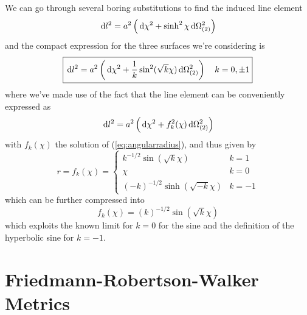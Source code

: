 We can go through several boring substitutions to find the induced line element
\begin{equation}
    \,\text{d}l^{2} = a^{2}\left(\,\text{d}\chi^{2} + \sinh^{2}\chi\,\text{d}\Omega_{(2)}^{2}\right)
\end{equation}
and the compact expression for the three surfaces we're considering is
\begin{equation}
    \boxed{
        \,\text{d}l^{2} = a^{2}\left(\,\text{d}\chi^{2} + \frac{1}{k}\sin^{2}(\sqrt{k}\chi)\,\text{d}\Omega_{(2)}^{2}\right) \quad k=0,\pm 1
    }
\end{equation}
where we've made use of the fact that the line element can be conveniently expressed as
\begin{equation}
    \,\text{d}l^{2} = a^{2}\left(\,\text{d}\chi^{2} + f_{k}^{2}(\chi)\,\text{d}\Omega_{(2)}^{2}\right)
\end{equation}
with $f_{k}(\chi)$ the solution of (\ref{eq:angularradius}), and thus given by
\begin{equation}
    r = f_{k}(\chi) = \left\{
    \begin{array}{ll}
        k^{-1/2}\sin(\sqrt{k}\chi) & k = 1\\
        \chi & k=0 \\
        (-k)^{-1/2}\sinh(\sqrt{-k}\chi) & k = -1
    \end{array}
    \right.
\end{equation}
which can be further compressed into
\begin{equation}
    f_{k}(\chi) = (k)^{-1/2}\sin(\sqrt{k}\chi)
\end{equation}
which exploits the known limit for $k=0$ for the sine and the definition of the hyperbolic sine for $k=-1$.

\section{Friedmann-Robertson-Walker Metrics}

